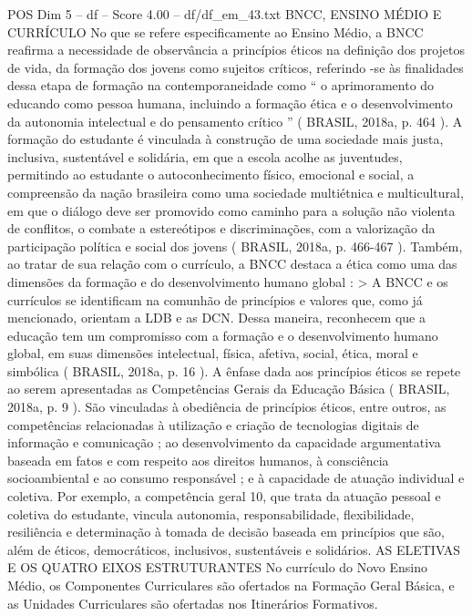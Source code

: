 \begin{textsample}{POS Dim 5 – df – Score 4.00 – df/df\_em\_43.txt}  \label{ex:f5_pos_158}
BNCC, ENSINO MÉDIO E CURRÍCULO No que se refere especificamente ao Ensino Médio, a BNCC reafirma a necessidade de observância a princípios éticos na definição dos projetos de vida, da formação dos jovens como sujeitos críticos, referindo -se às finalidades dessa etapa de formação na contemporaneidade como “ o aprimoramento do educando como pessoa humana, incluindo a formação ética e o desenvolvimento da autonomia intelectual e do pensamento crítico ” ( BRASIL, 2018a, p. 464 ).
A formação do estudante é vinculada à construção de uma sociedade mais justa, inclusiva, sustentável e solidária, em que a escola acolhe as juventudes, permitindo ao estudante o autoconhecimento físico, emocional e social, a compreensão da nação brasileira como uma sociedade multiétnica e multicultural, em que o diálogo deve ser promovido como caminho para a solução não violenta de conflitos, o combate a estereótipos e discriminações, com a valorização da participação política e social dos jovens ( BRASIL, 2018a, p. 466-467 ).
Também, ao tratar de sua relação com o currículo, a BNCC destaca a ética como uma das dimensões da formação e do desenvolvimento humano global : > A BNCC e os currículos se identificam na comunhão de princípios e valores que, como já mencionado, orientam a LDB e as DCN.
Dessa maneira, reconhecem que a educação tem um compromisso com a formação e o desenvolvimento humano global, em suas dimensões intelectual, física, afetiva, social, ética, moral e simbólica ( BRASIL, 2018a, p. 16 ).
A ênfase dada aos princípios éticos se repete ao serem apresentadas as Competências Gerais da Educação Básica ( BRASIL, 2018a, p. 9 ).
São vinculadas à obediência de princípios éticos, entre outros, as competências relacionadas à utilização e criação de tecnologias digitais de informação e comunicação ; ao desenvolvimento da capacidade argumentativa baseada em fatos e com respeito aos direitos humanos, à consciência socioambiental e ao consumo responsável ; e à capacidade de atuação individual e coletiva.
Por exemplo, a competência geral 10, que trata da atuação pessoal e coletiva do estudante, vincula autonomia, responsabilidade, flexibilidade, resiliência e determinação à tomada de decisão baseada em princípios que são, além de éticos, democráticos, inclusivos, sustentáveis e solidários.
AS ELETIVAS E OS QUATRO EIXOS ESTRUTURANTES No currículo do Novo Ensino Médio, os Componentes Curriculares são ofertados na Formação Geral Básica, e as Unidades Curriculares são ofertadas nos Itinerários Formativos.

\end{textsample}
